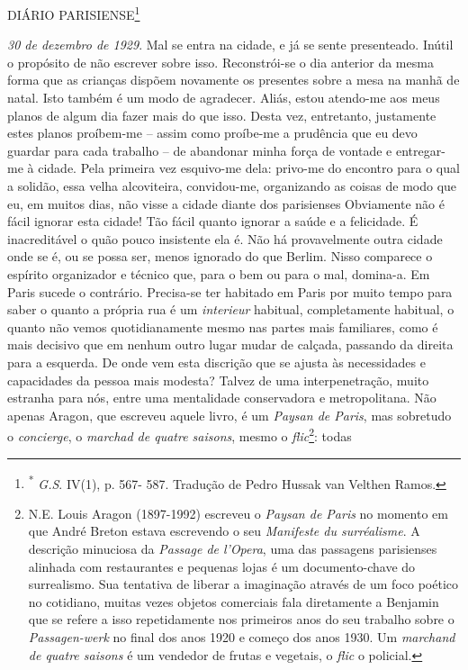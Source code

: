 DIÁRIO PARISIENSE\footnote{\textsuperscript{*} \emph{G.S}. IV(1), p.
  567- 587. Tradução de Pedro Hussak van Velthen Ramos.}

\emph{30 de dezembro de 1929}. Mal se entra na cidade, e já se sente
presenteado. Inútil o propósito de não escrever sobre isso.
Reconstrói-se o dia anterior da mesma forma que as crianças dispõem
novamente os presentes sobre a mesa na manhã de natal. Isto também é um
modo de agradecer. Aliás, estou atendo-me aos meus planos de algum dia
fazer mais do que isso. Desta vez, entretanto, justamente estes planos
proíbem-me -- assim como proíbe-me a prudência que eu devo guardar para
cada trabalho -- de abandonar minha força de vontade e entregar-me à
cidade. Pela primeira vez esquivo-me dela: privo-me do encontro para o
qual a solidão, essa velha alcoviteira, convidou-me, organizando as
coisas de modo que eu, em muitos dias, não visse a cidade diante dos
parisienses Obviamente não é fácil ignorar esta cidade! Tão fácil quanto
ignorar a saúde e a felicidade. É inacreditável o quão pouco insistente
ela é. Não há provavelmente outra cidade onde se é, ou se possa ser,
menos ignorado do que Berlim. Nisso comparece o espírito organizador e
técnico que, para o bem ou para o mal, domina-a. Em Paris sucede o
contrário. Precisa-se ter habitado em Paris por muito tempo para saber o
quanto a própria rua é um \emph{interieur} habitual, completamente
habitual, o quanto não vemos quotidianamente mesmo nas partes mais
familiares, como é mais decisivo que em nenhum outro lugar mudar de
calçada, passando da direita para a esquerda. De onde vem esta discrição
que se ajusta às necessidades e capacidades da pessoa mais modesta?
Talvez de uma interpenetração, muito estranha para nós, entre uma
mentalidade conservadora e metropolitana. Não apenas Aragon, que
escreveu aquele livro, é um \emph{Paysan de Paris}, mas sobretudo o
\emph{concierge}, o \emph{marchad de quatre saisons}, mesmo o
\emph{flic}\footnote{N.E. Louis Aragon (1897-1992) escreveu o
  \emph{Paysan de Paris} no momento em que André Breton estava
  escrevendo o seu \emph{Manifeste du surréalisme}. A descrição
  minuciosa da \emph{Passage de l'Opera}, uma das passagens parisienses
  alinhada com restaurantes e pequenas lojas é um documento-chave do
  surrealismo. Sua tentativa de liberar a imaginação através de um foco
  poético no cotidiano, muitas vezes objetos comerciais fala diretamente
  a Benjamin que se refere a isso repetidamente nos primeiros anos do
  seu trabalho sobre o \emph{Passagen-werk} no final dos anos 1920 e
  começo dos anos 1930. Um \emph{marchand de quatre saisons} é um
  vendedor de frutas e vegetais, o \emph{flic} o policial.}: todas
